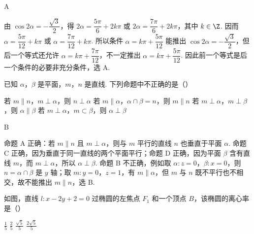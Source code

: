 \begin{answer}
A
\end{answer}

\begin{solution}
由 \(\cos 2\alpha=-\dfrac{\sqrt{3}}{2}\)，得
\(2\alpha=\dfrac{5\pi}{6}+2k\pi\) 或 \(2\alpha=\dfrac{7\pi}{6}+2k\pi\)，其中 \(k\in\Z\). 因而
\(\alpha=\dfrac{5\pi}{12}+k\pi\) 或 \(\alpha=\dfrac{7\pi}{12}+k\pi\). 所以条件 \(\alpha=k\pi+\dfrac{5\pi}{12}\) 能推出 \(\cos 2\alpha=-\dfrac{\sqrt{3}}{2}\)，但后一个等式还允许 \(\alpha=k\pi+\dfrac{7\pi}{12}\)，不一定推出 \(\alpha=k\pi+\dfrac{5\pi}{12}\). 因此前一个等式是后一个条件的必要非充分条件，选 A.
\end{solution}

\begin{problem}
已知 \(\alpha\)，\(\beta\) 是平面，\(m\)，\(n\) 是直线. 下列命题中不正确的是（\quad）

\choices
    {若 \(m \parallel n\)，\(m \perp \alpha\)，则 \(n \perp \alpha\)}
    {若 \(m \parallel \alpha\)，\(\alpha \cap \beta = n\)，则 \(m \parallel n\)}
    {若 \(m \perp \alpha\)，\(m \perp \beta\)，则 \(\alpha \parallel \beta\)}
    {若 \(m \perp \alpha\)，\(m \subset \beta\)，则 \(\alpha \perp \beta\)}
\end{problem}

\begin{answer}
B
\end{answer}

\begin{solution}
命题 A 正确：若 \(m\parallel n\) 且 \(m\perp\alpha\)，则与 \(m\) 平行的直线 \(n\) 也垂直于平面 \(\alpha\). 命题 C 正确，因为垂直于同一直线的两个平面平行；命题 D 正确，因为平面 \(\beta\) 含有直线 \(m\)，而 \(m\perp\alpha\)，所以 \(\alpha\perp\beta\). 命题 B 不正确，例如取 \(\alpha:z=0\)，\(\beta:x=0\)，则 \(n=\alpha\cap\beta\) 是 \(y\) 轴；取 \(m:y=0\)，\(z=1\)，有 \(m\parallel\alpha\)，但 \(m\) 与 \(n\) 既不平行也不相交，故不能推出 \(m\parallel n\)，选 B.
\end{solution}

\begin{problem}
如图，直线 \(l: x - 2y + 2 = 0\) 过椭圆的左焦点 \(F_1\) 和一个顶点 \(B\)，该椭圆的离心率是（\quad）


\choices
    {\(\frac{1}{5}\)}
    {\(\frac{2}{5}\)}
    {\(\frac{\sqrt{5}}{5}\)}
    {\(\frac{2\sqrt{5}}{5}\)}
\end{problem}

